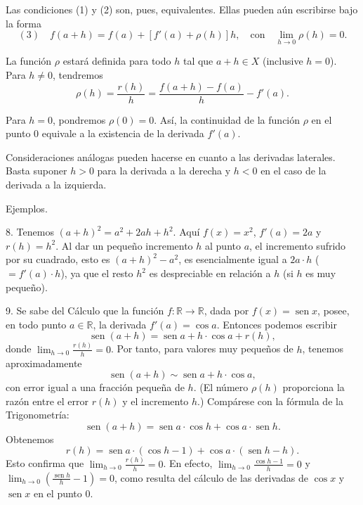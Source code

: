 \documentclass[12pt,oneside]{book}
\begin{document}
Las condiciones (1) y (2) son, pues, equivalentes. Ellas pueden aún escribirse bajo la forma
\[
(3) \quad f(a+h) = f(a) + [f'(a) + \rho(h)]h, \quad \text{con} \quad \lim_{h \to 0} \rho(h) = 0.
\]

La función \( \rho \) estará definida para todo \( h \) tal que \( a+h \in X \) (inclusive \( h=0 \)). Para \( h \neq 0 \), tendremos
\[
\rho(h) = \frac{r(h)}{h} = \frac{f(a+h) - f(a)}{h} - f'(a).
\]

Para \( h=0 \), pondremos \( \rho(0)=0 \). Así, la continuidad de la función \( \rho \) en el punto \( 0 \) equivale a la existencia de la derivada \( f'(a) \).

Consideraciones análogas pueden hacerse en cuanto a las derivadas laterales. Basta suponer \( h>0 \) para la derivada a la derecha y \( h<0 \) en el caso de la derivada a la izquierda.

Ejemplos.

8. Tenemos \( (a+h)^2 = a^2 + 2ah + h^2 \). Aquí \( f(x) = x^2 \), \( f'(a) = 2a \) y \( r(h) = h^2 \). Al dar un pequeño incremento \( h \) al punto \( a \), el incremento sufrido por su cuadrado, esto es \( (a+h)^2 - a^2 \), es esencialmente igual a \( 2a \cdot h \) (\( = f'(a) \cdot h \)), ya que el resto \( h^2 \) es despreciable en relación a \( h \) (si \( h \) es muy pequeño).

9. Se sabe del Cálculo que la función \( f: \mathbb{R} \to \mathbb{R} \), dada por \( f(x) = \operatorname{sen} x \), posee, en todo punto \( a \in \mathbb{R} \), la derivada \( f'(a) = \cos a \). Entonces podemos escribir
\[
\operatorname{sen}(a + h) = \operatorname{sen} a + h \cdot \cos a + r(h),
\]
donde \( \lim_{h \to 0} \frac{r(h)}{h} = 0 \). Por tanto, para valores muy pequeños de \( h \), tenemos aproximadamente
\[
\operatorname{sen}(a + h) \sim \operatorname{sen} a + h \cdot \cos a,
\]
con error igual a una fracción pequeña de \( h \). (El número \( \rho(h) \) proporciona la razón entre el error \( r(h) \) y el incremento \( h \).) Compárese con la fórmula de la Trigonometría:
\[
\operatorname{sen}(a + h) = \operatorname{sen} a \cdot \cos h + \cos a \cdot \operatorname{sen} h.
\]
Obtenemos
\[
r(h) = \operatorname{sen} a \cdot (\cos h - 1) + \cos a \cdot (\operatorname{sen} h - h).
\]
Esto confirma que \( \lim_{h \to 0} \frac{r(h)}{h} = 0 \). En efecto, \( \lim_{h \to 0} \frac{\cos h - 1}{h} = 0 \) y \( \lim_{h \to 0} \left( \frac{\operatorname{sen} h}{h} - 1 \right) = 0 \), como resulta del cálculo de las derivadas de \( \cos x \) y \( \operatorname{sen} x \) en el punto \( 0 \).
\end{document}
